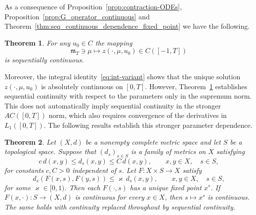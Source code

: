 \documentclass[reqno]{amsart}
\theoremstyle{plain}
\newtheorem{theorem}{Theorem}[section]
\numberwithin{equation}{section}
\numberwithin{definition}{section}
\begin{document}
As a consequence of Proposition~\ref{prop:contraction-ODEs}, Proposition~\ref{prop:G_operator_continuous} and Theorem~\ref{thm:seq_continuous_dependence_fixed_point} we have the following.   
\begin{theorem}\label{thrm:C-cnontin-sol} For any $u_0\in C$ the mapping 
    \begin{equation*} 
         \mathfrak{m}_T \ni \mu \mapsto z(\cdot,\mu,u_0)\in C([-1, T])  
    \end{equation*}
    is sequentially continuous. 
\end{theorem}

Moreover, the integral identity~\eqref{eq:int-variant}
shows that the unique solution $z(\cdot,\mu,u_0)$ is
absolutely continuous on $[0,T]$.
However, Theorem~\ref{thrm:C-cnontin-sol} establishes
sequential continuity with respect to the parameters
only in the supremum norm. This does not automatically
imply sequential continuity in the stronger
$AC([0,T])$ norm, which also requires convergence
of the derivatives in $L_1([0,T])$.
The following results establish this stronger
parameter dependence.

\begin{theorem}\label{Thrm:familie-uniform-banach-uniform}
Let $(X,d)$ be a nonempty complete metric space and let $S$
be a topological space. Suppose that $(d_s)_{s\in S}$
is a family of metrics on $X$ satisfying
\begin{equation*}
    c\,d(x,y)\leq d_s(x,y)\leq C\,d(x,y),
    \qquad x,y\in X,\quad s\in S,
\end{equation*}
for constants $c,C>0$ independent of $s$.
Let $F:X\times S\to X$ satisfy
\begin{equation*}
    d_s(F(x,s),F(y,s))
    \leq \varkappa\,d_s(x,y),
    \qquad x,y\in X,\quad s\in S,
\end{equation*}
for some $\varkappa\in[0,1)$. Then each $F(\cdot,s)$ has a unique fixed point $x^s$.
If $F(x,\cdot):S\to(X,d)$ is continuous for every $x\in X$,
then $s\mapsto x^s$ is continuous.
The same holds with continuity replaced
throughout by sequential continuity.
\end{theorem}
\end{document}

